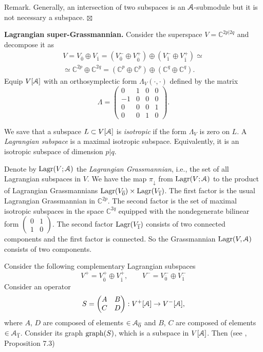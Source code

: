 \documentclass[]{amsart}
\newcounter{sec}
\newcounter{punct}[sec]
\def\punct{\refstepcounter{punct}{\arabic{sec}.\arabic{punct}.  }}
\newcommand{\graph}{\mathop{\rm graph}\nolimits}
\newcommand{\Lagr}{\mathop{\rm Lagr}\nolimits}
\def\cA{\EuScript A}
\def\C {{\mathbb C }}
\def\ov{\overline}
\def\sm{\smallskip}
\def\0{{\ov 0}}
\def\1{{\ov 1}}
\begin{document}
\sm 

{\sc Remark.} Generally, an intersection of two subspaces is an $\cA$-submodule
but  it is not necessary a subspace.
\hfill $\boxtimes$

\sm

{\bf \punct Lagrangian super-Grassmannian.} Consider the superspace 
$V= \C^{2p|2q}$ and decompose it as
\begin{multline}
	V=V_\0\oplus V_\1=(V_\0^-\oplus V_\0^+)\oplus (V_\1^-\oplus V_\1^+)
	\simeq\\ \simeq \C^{2p}\oplus\C^{2q}
	=
	(\C^p\oplus\C^p)\oplus(\C^q\oplus \C^q).
	\label{eq:VVVV}
\end{multline}
Equip $V[\cA]$ with an orthosymplectic form $\Lambda_V(\cdot,\cdot)$ defined by the matrix
$$
\Lambda=
\left(
\begin{array}{cc|cc}
	0&1&0&0\\
	-1&0&0&0\\
	\hline 
	0&0&0&1\\
	0&0&1&0
\end{array}
\right).
$$

We save that a subspace $L\subset V[\cA]$ is {\it isotropic} if the form $\Lambda_V$ is zero on $L$.
A {\it Lagrangian subspace} is a maximal isotropic subspace. Equivalently,
it is an isotropic subspace of dimension $p|q$. 

Denote by $\Lagr(V;\cA)$ the {\it Lagrangian Grassmannian}, i.e., the set of all Lagrangian subspaces in $V$.
We have the map $\pi_\downarrow$ from $\Lagr(V;\cA)$
to the product of  Lagrangian Grassmannians
$\Lagr(V_\0)\times \Lagr(V_\1)$. The first factor is the usual Lagrangian Grassmannian
in $\C^{2p}$. The second factor is the set of maximal isotropic subspaces in the space $\C^{2q}$
equipped with the nondegenerate bilinear form 
$\begin{pmatrix}
	0&1\\1&0
\end{pmatrix}$. The second factor $\Lagr(V_\1)$ consists of two connected components
and the first factor is connected.
So the Grassmannian $\Lagr(V,\cA)$ consists of two components.






\sm 

Consider the following complementary Lagrangian subspaces 
$$
V^+=V_\0^+\oplus  V^+_\1, \qquad V^-=V_\0^- \oplus V^-_\1
$$
Consider an operator 
$$
S=\begin{pmatrix}
	A&B\\C&D
\end{pmatrix}:V^+[\cA]\to V^-[\cA],
$$
where $A$, $D$ are composed of elements $\in \cA_\0$ and $B$, $C$ are composed of elements $\in\cA_\1$.
Consider its graph  $\graph(S)$, which is a subspace in $V[\cA]$.
Then (see \cite{Ner-super}, Proposition 7.3)
\end{document}
